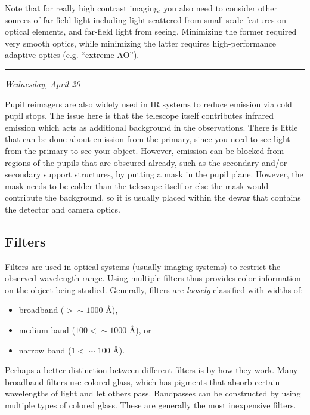 \documentclass[12pt]{article}
\newcommand{\mydate}[1]{
    \begin{flushright}
        \rule{\textwidth}{0.4pt} %
        \footnotesize\hfill\textit{#1}
    \end{flushright}}
\begin{document}
Note that for really high contrast imaging, you also need to consider
other sources of far-field light including light scattered from
small-scale features on optical elements, and far-field light from
seeing. Minimizing the former required very smooth optics, while
minimizing the latter requires high-performance adaptive optics (e.g.
``extreme-AO'').

\mydate{Wednesday, April 20}

Pupil reimagers are also widely used in IR systems to reduce emission via cold
pupil stops. The issue here is that the telescope itself contributes infrared
emission which acts as additional background in the observations. There is
little that can be done about emission from the primary, since you need to see
light from the primary to see your object. However, emission can be blocked
from regions of the pupils that are obscured already, such as the secondary
and/or secondary support structures, by putting a mask in the pupil plane.
However, the mask needs to be colder than the telescope itself or else the mask
would contribute the background, so it is usually placed within the dewar that
contains the detector and camera optics.

\subsection{Filters}
Filters are used in optical systems (usually imaging systems) to
restrict the observed wavelength range. Using multiple filters thus
provides color information on the object being studied. Generally,
filters are \emph{loosely} classified with widths of:
\begin{itemize}
    \item broadband ($ > \sim 1000$ \AA{}),
    \item medium band ($100 < \sim 1000$ \AA{}), or
    \item narrow band ($1 < \sim 100$ \AA{}).
\end{itemize}

Perhaps a better distinction between different filters is by how they work.
Many broadband filters use colored glass, which has pigments that absorb
certain wavelengths of light and let others pass. Bandpasses can be constructed
by using multiple types of colored glass. These are generally the most
inexpensive filters.
\end{document}
